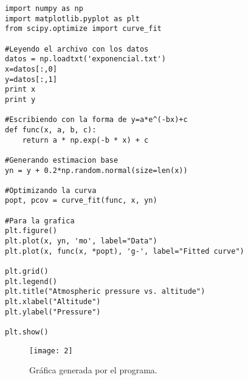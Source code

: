 \documentclass[12pt]{article}
\begin{document}
\begin{verbatim}
import numpy as np
import matplotlib.pyplot as plt
from scipy.optimize import curve_fit

#Leyendo el archivo con los datos
datos = np.loadtxt('exponencial.txt')
x=datos[:,0]
y=datos[:,1]
print x
print y

#Escribiendo con la forma de y=a*e^(-bx)+c
def func(x, a, b, c):
    return a * np.exp(-b * x) + c

#Generando estimacion base
yn = y + 0.2*np.random.normal(size=len(x))

#Optimizando la curva
popt, pcov = curve_fit(func, x, yn)

#Para la grafica
plt.figure()
plt.plot(x, yn, 'mo', label="Data")
plt.plot(x, func(x, *popt), 'g-', label="Fitted curve")

plt.grid()
plt.legend()
plt.title("Atmospheric pressure vs. altitude")
plt.xlabel("Altitude")
plt.ylabel("Pressure")

plt.show()
\end{verbatim}

\begin{figure}[H]
\centering
\texttt{[image: 2]}
\caption{Gráfica generada por el programa.}
\end{figure}

\pagebreak
\end{document}
